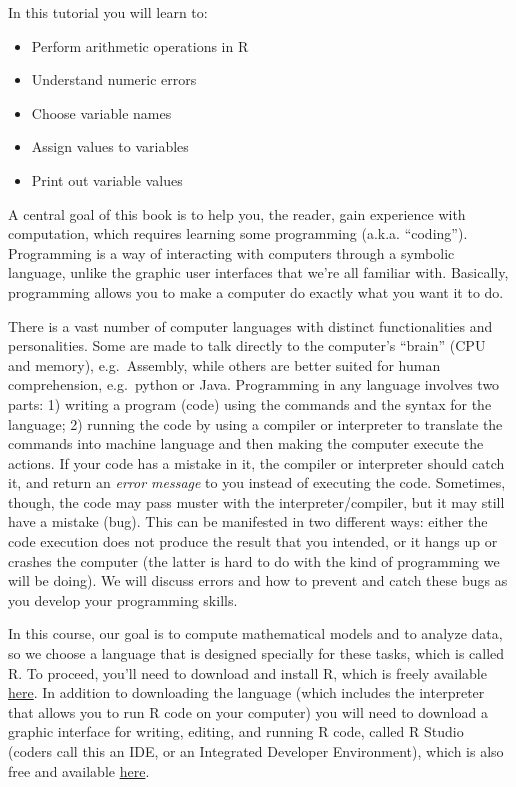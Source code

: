 \documentclass[
  letterpaper,
  DIV=11,
  numbers=noendperiod]{scrreprt}
\begin{document}
In this tutorial you will learn to:

\begin{itemize}
\item
  Perform arithmetic operations in R
\item
  Understand numeric errors
\item
  Choose variable names
\item
  Assign values to variables
\item
  Print out variable values
\end{itemize}

A central goal of this book is to help you, the reader, gain experience
with computation, which requires learning some programming (a.k.a.
``coding''). Programming is a way of interacting with computers through
a symbolic language, unlike the graphic user interfaces that we're all
familiar with. Basically, programming allows you to make a computer do
exactly what you want it to do.

There is a vast number of computer languages with distinct
functionalities and personalities. Some are made to talk directly to the
computer's ``brain'' (CPU and memory), e.g.~Assembly, while others are
better suited for human comprehension, e.g.~python or Java. Programming
in any language involves two parts: 1) writing a program (code) using
the commands and the syntax for the language; 2) running the code by
using a compiler or interpreter to translate the commands into machine
language and then making the computer execute the actions. If your code
has a mistake in it, the compiler or interpreter should catch it, and
return an \emph{error message} to you instead of executing the code.
Sometimes, though, the code may pass muster with the
interpreter/compiler, but it may still have a mistake (bug). This can be
manifested in two different ways: either the code execution does not
produce the result that you intended, or it hangs up or crashes the
computer (the latter is hard to do with the kind of programming we will
be doing). We will discuss errors and how to prevent and catch these
bugs as you develop your programming skills.

In this course, our goal is to compute mathematical models and to
analyze data, so we choose a language that is designed specially for
these tasks, which is called R. To proceed, you'll need to download and
install R, which is freely available \href{cran.r-project.org/}{here}.
In addition to downloading the language (which includes the interpreter
that allows you to run R code on your computer) you will need to
download a graphic interface for writing, editing, and running R code,
called R Studio (coders call this an IDE, or an Integrated Developer
Environment), which is also free and available
\href{www.rstudio.com/products/rstudio/download/}{here}.
\end{document}
